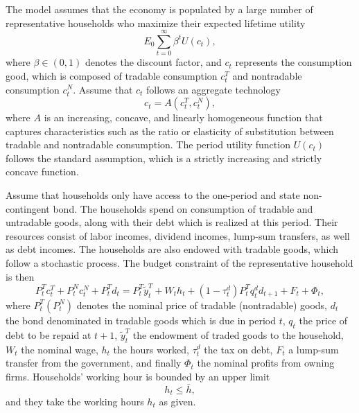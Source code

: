 The model assumes that the economy is populated by a large number of representative households who maximize their expected lifetime utility
\begin{equation}
    \label{eq:utility}
    E_0 \sum_{t=0}^\infty \beta^t U(c_t),
\end{equation}
where $\beta \in(0,1)$ denotes the discount factor,
and $c_t$ represents the consumption good, which is composed of
tradable consumption $c_t^T$ and nontradable consumption $c_t^N$.
Assume that $c_t$ follows an aggregate technology
\begin{equation}
    \label{eq:A}
    c_t = A(c^T_t, c^N_t),
\end{equation}
where $A$ is an increasing, concave, and linearly homogeneous function that captures characteristics such as the ratio or elasticity of substitution between tradable and nontradable consumption.
The period utility function $U(c_t)$ follows the standard assumption, which is a strictly increasing and strictly concave function.

Assume that households only have access to the one-period and state non-contingent bond.
The households spend on consumption of tradable and untradable goods, along with their debt which is realized at this period. Their resources consist of labor incomes, dividend incomes, lump-sum transfers, as well as debt incomes. The households are also endowed with tradable goods, which follow a stochastic process.
The budget constraint of the representative household is then
\begin{equation}
    \label{eq:bc}
    P^T_t c^T_t + P^N_t c^N_t + P^T_t d_t =
    P^T_t \tilde{y}^T_t + W_t h_t + (1- \tau^d_t)P^T_t q^d_t d_{t+1} + F_t + \Phi_t,
\end{equation}
where $P^T_t (P^N_t)$ denotes the nominal price of tradable (nontradable) goods, $d_t$ the bond denominated in tradable goods which is due in period $t$, $q_t$ the price of debt to be repaid at $t+1$, $\tilde{y}^T_t$ the endowment of traded goods to the household, $W_t$ the nominal wage, $h_t$ the hours worked, $\tau^d_t$ the tax on debt, $F_t$ a lump-sum transfer from the government, and finally $\Phi_t$ the nominal profits from owning firms.
Households' working hour is bounded by an upper limit
\begin{equation}
    \label{eq:h-constraint}
    h_t \le \bar{h},
\end{equation}
and they take the working hours $h_t$ as given.

